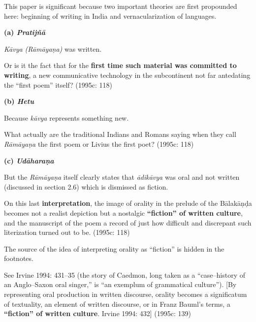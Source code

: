This paper is significant because two important theories are first propounded here: beginning of writing in India and vernacularization of languages.

\textbf{(a) \textit{Pratijñā}}

\textit{Kāvya (Rāmāyaṇa)} was written.

\begin{myquote}
Or is it the fact that for the \textbf{first time such material was committed to writing}, a new communicative technology in the subcontinent not far antedating the “first poem” itself? (1995c: 118)
\end{myquote}

\textbf{(b) \textit{Hetu}}

Because\textit{ kāvya} represents something new.

\begin{myquote}
What actually are the traditional Indians and Romans saying when they call \textit{Rāmāyaṇa} the first poem or Livius the first poet? (1995c: 118)
\end{myquote}

\textbf{(c) \textit{Udāharaṇa}}

But the \textit{Rāmāyaṇa }itself clearly states that \textit{ādikāvya} was oral and not written (discussed in section 2.6) which is dismissed as fiction.

\begin{myquote}
On this last \textbf{interpretation}, the image of orality in the prelude of the Bālakāṇḍa becomes not a realist depiction but a nostalgic \textbf{“fiction” of written culture}, and the manuscript of the poem a record of just how difficult and discrepant such literization turned out to be. (1995c: 118)
\end{myquote}

The source of the idea of interpreting orality as “fiction” is hidden in the footnotes.

\begin{myquote}
See Irvine 1994: 431–35 (the story of Caedmon, long taken as a “case–history of an Anglo–Saxon oral singer,” is ``an exemplum of grammatical culture”). [By representing oral production in written discourse, orality becomes a significatum of textuality, an element of written discourse, or in Franz Bauml’s terms, a \textbf{“fiction” of written culture}. Irvine 1994: 432] (1995c: 139)
\end{myquote}

